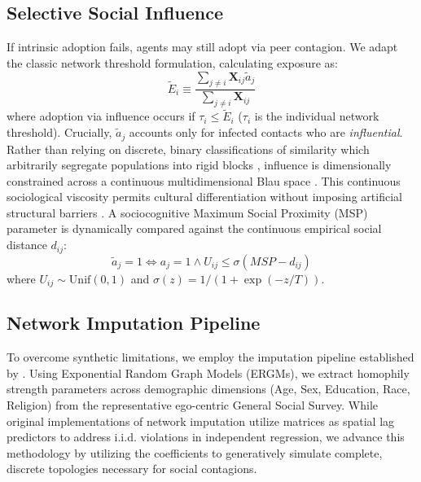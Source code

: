 \documentclass[5p,twocolumn,authoryear]{elsarticle}
\begin{document}
\subsection{Selective Social Influence}
If intrinsic adoption fails, agents may still adopt via peer contagion. We adapt the classic network threshold formulation, calculating exposure as:
\begin{equation}
    \tilde{E}_i \equiv \frac{\sum_{j \neq i} \mathbf{X}_{ij} \tilde{a}_j}{\sum_{j \neq i} \mathbf{X}_{ij}}
\end{equation}
where adoption via influence occurs if $\tau_i \le \tilde{E}_i$ ($\tau_i$ is the individual network threshold). Crucially, $\tilde{a}_j$ accounts only for infected contacts who are \textit{influential}. Rather than relying on discrete, binary classifications of similarity which arbitrarily segregate populations into rigid blocks \citep{carrington2016}, influence is dimensionally constrained across a continuous multidimensional Blau space \citep{blau1977, mcpherson2004}. This continuous sociological viscosity permits cultural differentiation without imposing artificial structural barriers \citep{dellaposta2015, goldberg2018}. A sociocognitive Maximum Social Proximity (MSP) parameter is dynamically compared against the continuous empirical social distance $d_{ij}$:
\begin{equation}
    \tilde{a}_j = 1 \iff a_j = 1 \land U_{ij} \le \sigma(MSP - d_{ij})
\end{equation}
where $U_{ij} \sim \text{Unif}(0, 1)$ and $\sigma(z) = 1 / (1 + \exp(-z/T))$.

\subsection{Network Imputation Pipeline}
To overcome synthetic limitations, we employ the imputation pipeline established by \citet{mcpherson2019}. Using Exponential Random Graph Models (ERGMs), we extract homophily strength parameters across demographic dimensions (Age, Sex, Education, Race, Religion) from the representative ego-centric General Social Survey. While original implementations of network imputation utilize matrices as spatial lag predictors to address i.i.d. violations in independent regression, we advance this methodology by utilizing the coefficients to generatively simulate complete, discrete topologies necessary for social contagions. 
\end{document}
